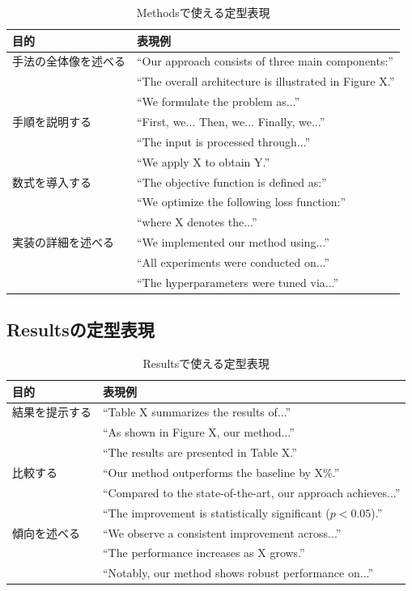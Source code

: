 \begin{table}[htbp]
\centering
\caption{Methodsで使える定型表現}
\label{tab:methods-expressions}
\footnotesize
\begin{tabular}{lp{}}
\toprule
目的 & 表現例 \\
\midrule
手法の全体像を述べる & ``Our approach consists of three main components:'' \\
 & ``The overall architecture is illustrated in Figure X.'' \\
 & ``We formulate the problem as...'' \\
\midrule
手順を説明する & ``First, we... Then, we... Finally, we...'' \\
 & ``The input is processed through...'' \\
 & ``We apply X to obtain Y.'' \\
\midrule
数式を導入する & ``The objective function is defined as:'' \\
 & ``We optimize the following loss function:'' \\
 & ``where X denotes the...'' \\
\midrule
実装の詳細を述べる & ``We implemented our method using...'' \\
 & ``All experiments were conducted on...'' \\
 & ``The hyperparameters were tuned via...'' \\
\bottomrule
\end{tabular}
\end{table}

\subsection{Resultsの定型表現}

\begin{table}[htbp]
\centering
\caption{Resultsで使える定型表現}
\label{tab:results-expressions}
\footnotesize
\begin{tabular}{lp{}}
\toprule
目的 & 表現例 \\
\midrule
結果を提示する & ``Table X summarizes the results of...'' \\
 & ``As shown in Figure X, our method...'' \\
 & ``The results are presented in Table X.'' \\
\midrule
比較する & ``Our method outperforms the baseline by X\%.'' \\
 & ``Compared to the state-of-the-art, our approach achieves...'' \\
 & ``The improvement is statistically significant ($p < 0.05$).'' \\
\midrule
傾向を述べる & ``We observe a consistent improvement across...'' \\
 & ``The performance increases as X grows.'' \\
 & ``Notably, our method shows robust performance on...'' \\
\bottomrule
\end{tabular}
\end{table}

